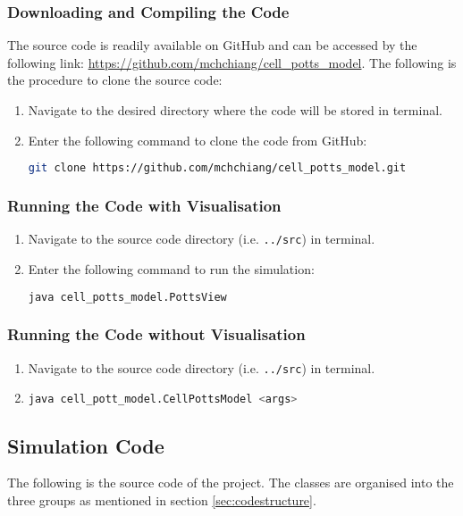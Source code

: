 \documentclass[a4paper,12pt]{article}
\begin{document}
\subsubsection{Downloading and Compiling the Code}
The source code is readily available on GitHub and can be accessed by the following link: \url{https://github.com/mchchiang/cell_potts_model}. The following is the procedure to clone the source code:
\begin{enumerate}
\item Navigate to the desired directory where the code will be stored in terminal.
\item Enter the following command to clone the code from GitHub:
\begin{lstlisting}[language=bash, basicstyle={\small\ttfamily}]
git clone https://github.com/mchchiang/cell_potts_model.git
\end{lstlisting}


\end{enumerate}

\subsubsection{Running the Code with Visualisation}
\begin{enumerate}
\item Navigate to the source code directory (i.e. \texttt{../src}) in terminal.
\item Enter the following command to run the simulation:
\begin{lstlisting}[language=bash, basicstyle={\small\ttfamily}]
java cell_potts_model.PottsView
\end{lstlisting}
\end{enumerate}

\subsubsection{Running the Code without Visualisation}
\begin{enumerate}
\item Navigate to the source code directory (i.e. \texttt{../src}) in terminal.
\item 
\begin{lstlisting}[language=bash, basicstyle={\small\ttfamily}]
java cell_pott_model.CellPottsModel <args>
\end{lstlisting}
\end{enumerate}

\subsection{Simulation Code}
\label{app:sourcecode}
The following is the source code of the project. The classes are organised into the three groups as mentioned in section \ref{sec:codestructure}.
\end{document}
